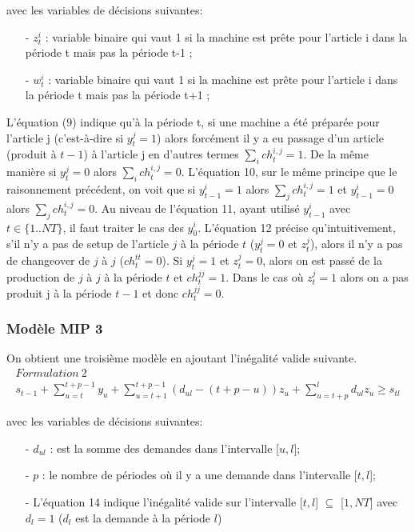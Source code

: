 \documentclass[12pt,a4paper]{article}
\begin{document}
		avec les variables de décisions suivantes: \\
		\begin{itemize}
			\item[-] $z_{t}^{i}$ : variable binaire qui vaut 1 si la machine est prête pour l'article i dans la période t mais pas la période t-1 ;
			\item[-] $w_{t}^{i}$ : variable binaire qui vaut 1 si la machine est prête pour l'article i dans la période t mais pas la période t+1 ;
		\end{itemize}
		\vspace*{.3cm}
		\hspace*{.5cm} L'équation (9) indique qu'à la période t, si une machine a été préparée pour l'article j (c’est-à-dire si $y_{t}^{j} = 1$) alors forcément il y a eu passage d’un article (produit à $t-1$) à l’article j en d’autres termes $\sum_{i} ch_{t}^{i,j} = 1$. De la même manière si $y_{t}^{j} = 0$ alors $\sum_{i} ch_{t}^{i,j} = 0$. L'équation 10, sur le même principe que le raisonnement précédent, on voit que si $y_{t-1}^{i} = 1$ alors $ \sum_{j} ch_{t}^{i,j} = 1$ et $y_{t-1}^{i} = 0$ alors $ \sum_{j} ch_{t}^{i,j} = 0$. Au niveau de l'équation 11, ayant utilisé $y_{t-1}^{i}$ avec $t \in \{1..NT\}$, il faut traiter le cas des $y_{0}^{i}$. L'équation 12 précise qu'intuitivement, s’il n’y a pas de setup de l’article $j$ à la période $t$ ($y_{t}^{j}=0$ et $z_{t}^{j}$), alors il n'y a pas de changeover de $j$ à $j$ ($ch_{t}^{tt} = 0$). Si $y_{t}^{j} = 1$ et $z_{t}^{j} = 0$, alors on est passé de la production de $j$ à $j$ à la période $t$ et $ch_{t}^{jj} = 1$. Dans le cas où $z_{t}^{j} = 1$ alors on a pas produit j à la période $t-1$ et donc $ch_{t}^{jj} = 0$. 
		
		\subsubsection{Modèle MIP 3}
		On obtient une troisième modèle en ajoutant l'inégalité valide suivante.
		\begin{eqnarray}
			Formulation \  2 \\
			s_{t-1} + \sum_{u=t}^{t+p-1} y_{u} + \sum_{u=t+1}^{t+p-1} (d_{ul}-(t+p-u))z_{u} + \sum_{u=t+p}^{l} d_{ul}z_{u} \geq s_{tl}
		\end{eqnarray}
		
		avec les variables de décisions suivantes: \\
		\begin{itemize}
			\item[-] $d_{ul}$ : est la somme des demandes dans l'intervalle [$u,l$];
			\item[-] $p$ :  le nombre de périodes où il y a une demande dans l'intervalle [$t,l$];
			\item[-] L'équation 14 indique l'inégalité valide sur l'intervalle [$t,l$] $\subseteq$ [$1,NT$] avec $d_{l}=1$ ($d_{l}$ est la demande à la période $l$)
		\end{itemize}
		
\end{document}

